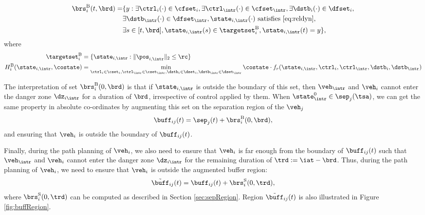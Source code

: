 \begin{equation} \label{eqn:buffBRS}
\begin{aligned}
\brs^{\text{B}}_{i}(t, \brd) = & \{y: \exists \ctrl_i(\cdot) \in \cfset_i, \exists \ctrl_\intr(\cdot) \in \cfset_\intr, \exists \dstb_i(\cdot) \in \dfset_i, \\
& \exists \dstb_\intr(\cdot) \in \dfset_\intr, \state_{i, \intr}(\cdot) \text{ satisfies \eqref{eq:reldyn}},\\
& \exists s \in [t, \brd], \state_{i, \intr}(s) \in \targetset^{\text{B}}_{i}, \state_{i, \intr}(t) = y\},
\end{aligned}
\end{equation}
where 
\begin{equation}
\begin{aligned}
\targetset^{\text{B}}_{i} &= \{\state_{i, \intr}: \|\pos_{i, \intr}\|_2 \le \rc\} \\
H^{\text{B}}_{i}(\state_{i, \intr}, \costate) &= \min_{\ctrl_i \in \cset_i, \ctrl_\intr \in \cset_\intr, \dstb_i \in \dset_i, \dstb_\intr \in \dset_\intr} \costate \cdot f_r(\state_{i, \intr}, \ctrl_i, \ctrl_\intr, \dstb_i, \dstb_\intr)
\end{aligned}
\end{equation}

The interpretation of set $\brs^{\text{B}}_{i}(0, \brd)$ is that if $\state_{i, \intr}$ is outside the boundary of this set, then $\veh_{\intr}$ and $\veh_{i}$ cannot enter the danger zone $\dz_{i\intr}$ for a duration of $\brd$, irrespective of control applied by them. When $\state_{\intr}^0 \in \sep_j(\tsa)$, we can get the same property in absolute co-ordinates by augmenting this set on the separation region of the $\veh_j$
\begin{equation} \label{eqn:buffRegion}
\buff_{ij}(t) = \sep_j(t) + \brs^{\text{B}}_{i}(0, \brd),
\end{equation} 
and ensuring that $\veh_i$ is outside the boundary of $\buff_{ij}(t)$.

Finally, during the path planning of $\veh_i$, we also need to ensure that $\veh_i$ is far enough from the boundary of $\buff_{ij}(t)$ such that $\veh_{\intr}$ and $\veh_{i}$ cannot enter the danger zone $\dz_{i\intr}$ for the remaining duration of $\trd := \iat - \brd$. Thus, during the path planning of $\veh_i$, we need to ensure that $\veh_i$ is outside the augmented buffer region:
\begin{equation} \label{eqn:augbuffRegion1}
\tilde{\buff}_{ij}(t) = \buff_{ij}(t) + \brs^{\text{S}}_{i}(0, \trd),
\end{equation}
where $\brs^{\text{S}}_{i}(0, \trd)$ can be computed as described in Section \ref{sec:sepRegion}. Region $\tilde{\buff}_{ij}(t)$ is also illustrated in Figure \ref{fig:buffRegion}.

